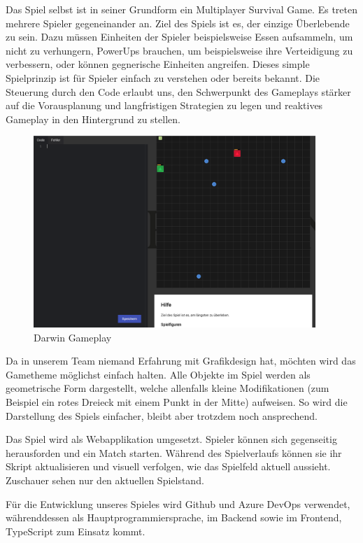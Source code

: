 \documentclass[11pt,a4paper,german]{scrartcl}
\begin{document}
Das Spiel selbst ist in seiner Grundform ein Multiplayer Survival Game.
Es treten mehrere Spieler gegeneinander an.
Ziel des Spiels ist es, der einzige Überlebende zu sein.
Dazu müssen Einheiten der Spieler beispielsweise Essen aufsammeln, um nicht zu verhungern, PowerUps brauchen, um beispielsweise ihre Verteidigung zu verbessern, oder können gegnerische Einheiten angreifen.
Dieses simple Spielprinzip ist für Spieler einfach zu verstehen oder bereits bekannt.
Die Steuerung durch den Code erlaubt uns, den Schwerpunkt des Gameplays stärker auf die Vorausplanung und langfristigen Strategien zu legen und reaktives Gameplay in den Hintergrund zu stellen.

\begin{figure}[h]
  \centering
  \includegraphics[width=0.95\textwidth]{darwin-gameplay}
  \caption{Darwin Gameplay}
\end{figure}

Da in unserem Team niemand Erfahrung mit Grafikdesign hat, möchten wird das Gametheme möglichst einfach halten.
Alle Objekte im Spiel werden als geometrische Form dargestellt, welche allenfalls kleine Modifikationen (zum Beispiel ein rotes Dreieck mit einem Punkt in der Mitte) aufweisen.
So wird die Darstellung des Spiels einfacher, bleibt aber trotzdem noch ansprechend.

Das Spiel wird als Webapplikation umgesetzt.
Spieler können sich gegenseitig herausforden und ein Match starten.
Während des Spielverlaufs können sie ihr Skript aktualisieren und visuell verfolgen, wie das Spielfeld aktuell aussieht. Zuschauer sehen nur den aktuellen Spielstand.

Für die Entwicklung unseres Spieles wird Github und Azure DevOps verwendet,
währenddessen als Hauptprogrammiersprache, im Backend sowie im Frontend, TypeScript zum Einsatz kommt.
\end{document}
